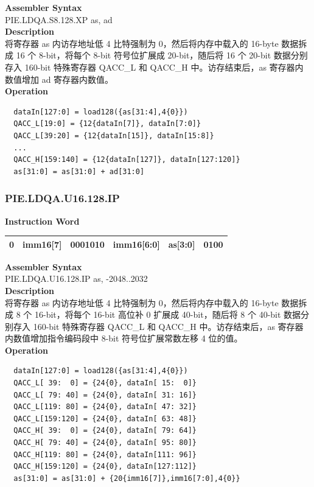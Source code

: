 \textbf{Assembler Syntax} \\
PIE.LDQA.S8.128.XP as, ad \\
\textbf{Description} \\
将寄存器 as 内访存地址低 4 比特强制为 0，然后将内存中载入的 16-byte 数据拆成 16 个 8-bit，将每个 8-bit 符号位扩展成 20-bit，随后将 16 个 20-bit 数据分别存入 160-bit 特殊寄存器 QACC\_L 和 QACC\_H 中。访存结束后，as 寄存器内数值增加 ad 寄存器内数值。\\
\textbf{Operation}
\begin{lstlisting}
  dataIn[127:0] = load128({as[31:4],4{0}})
  QACC_L[19:0] = {12{dataIn[7]}, dataIn[7:0]}
  QACC_L[39:20] = {12{dataIn[15]}, dataIn[15:8]}
  ...
  QACC_H[159:140] = {12{dataIn[127]}, dataIn[127:120]}
  as[31:0] = as[31:0] + ad[31:0]
\end{lstlisting}

\newpage
\subsubsection{PIE.LDQA.U16.128.IP}\label{instruction:PIELDQAU16128IP}
\setlength\tabcolsep{6pt}
\textbf{Instruction Word} \\
\begin{tabular}{|c|c|c|c|c|c|}
	\hline
	0 & imm16[7] & 0001010 & imm16[6:0] & as[3:0] & 0100 \\
	\hline
\end{tabular}

\textbf{Assembler Syntax} \\
PIE.LDQA.U16.128.IP as, -2048..2032 \\
\textbf{Description} \\
将寄存器 as 内访存地址低 4 比特强制为 0，然后将内存中载入的 16-byte 数据拆成 8 个 16-bit，将每个 16-bit 高位补 0 扩展成 40-bit，随后将 8 个 40-bit 数据分别存入 160-bit 特殊寄存器 QACC\_L 和 QACC\_H 中。访存结束后，as 寄存器内数值增加指令编码段中 8-bit 符号位扩展常数左移 4 位的值。\\
\textbf{Operation}
\begin{lstlisting}
  dataIn[127:0] = load128({as[31:4],4{0}})
  QACC_L[ 39:  0] = {24{0}, dataIn[ 15:  0]}
  QACC_L[ 79: 40] = {24{0}, dataIn[ 31: 16]}
  QACC_L[119: 80] = {24{0}, dataIn[ 47: 32]}
  QACC_L[159:120] = {24{0}, dataIn[ 63: 48]}
  QACC_H[ 39:  0] = {24{0}, dataIn[ 79: 64]}
  QACC_H[ 79: 40] = {24{0}, dataIn[ 95: 80]}
  QACC_H[119: 80] = {24{0}, dataIn[111: 96]}
  QACC_H[159:120] = {24{0}, dataIn[127:112]}
  as[31:0] = as[31:0] + {20{imm16[7]},imm16[7:0],4{0}}
\end{lstlisting}

